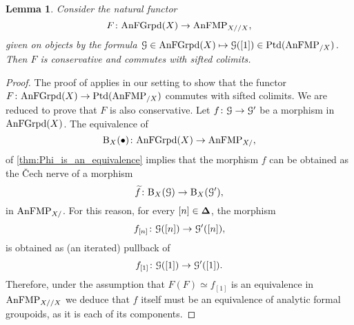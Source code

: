 \documentclass[10pt,a4paper,reqno]{amsart} %
\theoremstyle{plain}
\newtheorem{lem}[thm]{Lemma}
\newtheorem{cor}[thm]{Corollary}
\theoremstyle{definition}
\theoremstyle{remark}
\numberwithin{equation}{section}
\begin{document}
\begin{lem} \label{lem:Fgroupoids_to_pointed_objects_is_conservative_and_commutes_with_sifted_colimits}
    Consider the natural functor
        \[
            F \colon \mathrm{AnFGrpd}(X) \to \mathrm{AnFMP}_{X/ /X},  
        \]
    given on objects by the formula $\mathcal G \in \mathrm{AnFGrpd}(X) \mapsto \mathcal G([1]) \in \mathrm{Ptd}(\mathrm{AnFMP}_{/ X})$. Then $F$ is conservative and
    commutes with sifted colimits.
\end{lem}

\begin{proof}
    The proof of \cite[Corollary 5.2.2.4]{Gaitsgory_Study_II} applies in our setting
    to show that the functor $F \colon \mathrm{AnFGrpd}(X) \to \mathrm{Ptd}(\mathrm{AnFMP}_{/ X})$
    commutes with sifted colimits. We are reduced to prove that $F$ is also conservative.
    Let $f \colon \mathcal G \to \mathcal G'$ be a morphism in $\mathrm{AnFGrpd}(X)$. The equivalence of \infcats 
        \[\mathrm B_X(\bullet) \colon \mathrm{AnFGrpd}(X) \to \mathrm{AnFMP}_{X/ },\]
    of \cref{thm:Phi_is_an_equivalence} implies that
    the morphism $f$ can be obtained as the \v{C}ech nerve of a morphism
        \[
            \widetilde{f} \colon \mathrm B_X(\mathcal G) \to \mathrm B_X(\mathcal G'),  
        \]
    in $\mathrm{AnFMP}_{X/ }$. For this reason, for every $[n] \in \bm{\Delta}$, the morphism
        \[f_{[n]} \colon \mathcal G([n]) \to \mathcal G'([n]),\]
    is obtained as (an iterated) pullback of
        \[f_{[1]} \colon \mathcal G([1]) \to \mathcal G'([1]).\]
    Therefore, under the assumption
    that $F(F) \simeq f_{[1]}$ is an equivalence in $\mathrm{AnFMP}_{X/ /X}$ we deduce that $f$ itself
    must be an equivalence of analytic formal groupoids, as it is each of its components.
\end{proof}


\end{document}
